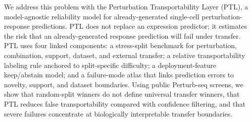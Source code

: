 We address this problem with the Perturbation Transportability Layer (PTL), a model-agnostic reliability model for already-generated single-cell perturbation-response predictions. PTL does not replace an expression predictor; it estimates the risk that an already-generated response prediction will fail under transfer. PTL uses four linked components: a stress-split benchmark for perturbation, combination, support, dataset, and external transfer; a relative transportability labeling rule anchored to split-specific difficulty; a deployment-feature keep/abstain model; and a failure-mode atlas that links prediction errors to novelty, support, and dataset boundaries. Using public Perturb-seq screens, we show that random-split winners do not define universal transfer winners, that PTL reduces false transportability compared with confidence filtering, and that severe failures concentrate at biologically interpretable transfer boundaries.
